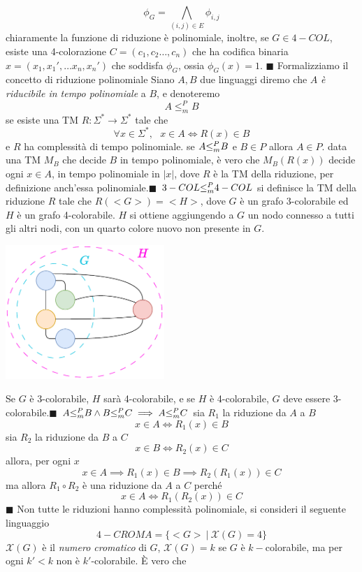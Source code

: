 \documentclass[10pt, letterpaper]{report}
\begin{document}
$$ \phi_G=\bigwedge\limits_{(i,j)\in E}\phi_{i,j}$$
chiaramente la funzione di riduzione è polinomiale, inoltre, se $G\in4-COL$, esiste una 4-colorazione $C=(c_1,c_2\dots, c_n)$ che ha codifica binaria $x=(x_1,x_1',\dots x_n,x_n')$ che soddisfa $\phi_G$, ossia $\phi_G(x)=1$. \hfill$\blacksquare$\acc   
Formalizziamo il concetto di riduzione polinomiale \acc 
{} Siano $A,B$ due linguaggi diremo che $A$ \textit{è riducibile in tempo polinomiale} a $B$, e denoteremo $$ A\le_m^P B$$ 
se esiste una TM $R:\Sigma^*\rightarrow \Sigma^*$ tale che 
$$ \forall x \in \Sigma^*, \ \ \ x\in A\iff R(x)\in B$$
e $R$ ha complessità di tempo polinomiale.\acc 
\teo{} se $A{\le_m^P} B$ e $B\in P$ allora $A\in P$. \acc 
\dimo{} data una TM $M_B$ che decide $B$ in tempo polinomiale, è vero che $M_B(R(x))$ decide ogni $x\in A$, in tempo polinomiale in $|x|$, dove $R$ è la TM della riduzione, per definizione anch'essa polinomiale.\hfill$\blacksquare$\acc  
\teo{} $3-COL{\le_m^P} 4-COL$\acc
\dimo{} si definisce la TM della riduzione $R$ tale che $R(<G>)=<H>$, dove $G$ è un grafo 3-colorabile ed $H$ è un grafo 4-colorabile. $H$ si ottiene aggiungendo a $G$ un nodo connesso a tutti gli altri nodi, con un quarto colore nuovo non presente in $G$.\begin{center}
    \includegraphics[width=0.45\textwidth ]{images/3COL4COL.drawio.pdf}
\end{center}
Se $G$ è 3-colorabile, $H$ sarà 4-colorabile, e se $H$ è 4-colorabile, $G$ deve essere 3-colorabile.\hfill$\blacksquare$\acc  
\teo{} $A{\le_m^P} B \land B{\le_m^P} C \implies A{\le_m^P} C$\acc 
\dimo{} sia $R_1$ la riduzione da $A$ a $B$ 
$$ x\in A \iff R_1(x)\in B$$
sia $R_2$ la riduzione da $B$ a $C$ 
$$ x\in B \iff R_2(x)\in C$$
allora, per ogni $x$
$$ x\in A\implies R_1(x)\in B \implies R_2(R_1(x))\in C$$
ma allora $R_1\circ R_2$ è una riduzione da $A$ a $C$ perché 
$$ x\in A \iff R_1(R_2(x))\in C$$\hfill$\blacksquare$\acc  
Non tutte le riduzioni hanno complessità polinomiale, si consideri il seguente linguaggio 
$$ 4-CROMA = \{<G>\ | \ \mathcal X(G)=4\}$$
$\mathcal X(G)$ è il \textit{numero cromatico} di $G$, $\mathcal X(G)=k$ se $G$ è $k-$colorabile, ma per ogni $k'<k$ non è $k'$-colorabile. È vero che 
\end{document}

